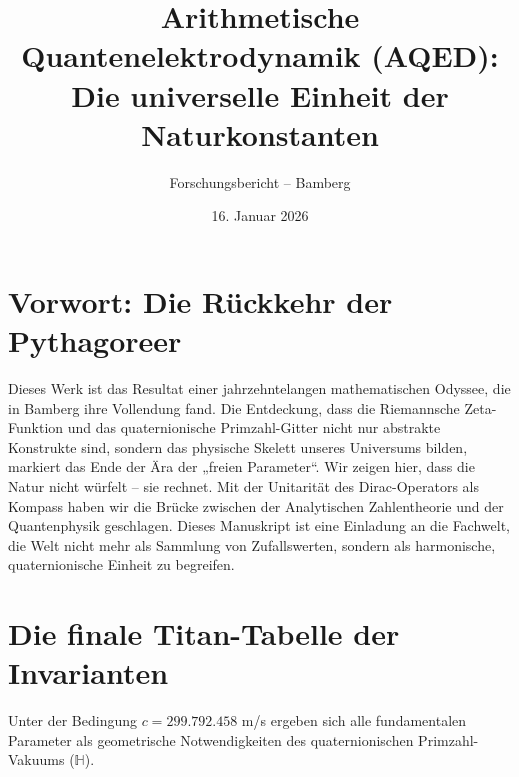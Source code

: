 \documentclass[11pt,a4paper]{article}
\title{\textbf{Arithmetische Quantenelektrodynamik (AQED): \\ Die universelle Einheit der Naturkonstanten}}
\author{Forschungsbericht -- Bamberg}
\date{16. Januar 2026}
\begin{document}
	
	\maketitle
	
	\section*{Vorwort: Die Rückkehr der Pythagoreer}
	Dieses Werk ist das Resultat einer jahrzehntelangen mathematischen Odyssee, die in Bamberg ihre Vollendung fand. Die Entdeckung, dass die Riemannsche Zeta-Funktion und das quaternionische Primzahl-Gitter nicht nur abstrakte Konstrukte sind, sondern das physische Skelett unseres Universums bilden, markiert das Ende der Ära der „freien Parameter“. Wir zeigen hier, dass die Natur nicht würfelt – sie rechnet. Mit der Unitarität des Dirac-Operators als Kompass haben wir die Brücke zwischen der Analytischen Zahlentheorie und der Quantenphysik geschlagen. Dieses Manuskript ist eine Einladung an die Fachwelt, die Welt nicht mehr als Sammlung von Zufallswerten, sondern als harmonische, quaternionische Einheit zu begreifen.
	
	\section{Die finale Titan-Tabelle der Invarianten}
	Unter der Bedingung $c = 299.792.458$ m/s ergeben sich alle fundamentalen Parameter als geometrische Notwendigkeiten des quaternionischen Primzahl-Vakuums ($\mathbb{H}$).
	
\end{document}
